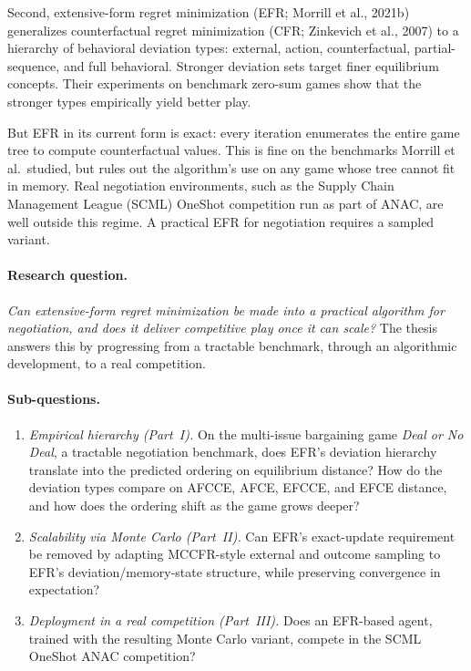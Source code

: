 \documentclass[11pt]{article}
\begin{document}
Second, extensive-form regret minimization (EFR; Morrill et al., 2021b) generalizes counterfactual regret minimization (CFR; Zinkevich et al., 2007) to a hierarchy of behavioral deviation types: external, action, counterfactual, partial-sequence, and full behavioral. Stronger deviation sets target finer equilibrium concepts. Their experiments on benchmark zero-sum games show that the stronger types empirically yield better play.

But EFR in its current form is exact: every iteration enumerates the entire game tree to compute counterfactual values. This is fine on the benchmarks Morrill et al.\ studied, but rules out the algorithm's use on any game whose tree cannot fit in memory. Real negotiation environments, such as the Supply Chain Management League (SCML) OneShot competition run as part of ANAC, are well outside this regime. A practical EFR for negotiation requires a sampled variant.

\paragraph{Research question.} \emph{Can extensive-form regret minimization be made into a practical algorithm for negotiation, and does it deliver competitive play once it can scale?} The thesis answers this by progressing from a tractable benchmark, through an algorithmic development, to a real competition.

\paragraph{Sub-questions.}
\begin{enumerate}
    \item \emph{Empirical hierarchy (Part~I).} On the multi-issue bargaining game \emph{Deal or No Deal}, a tractable negotiation benchmark, does EFR's deviation hierarchy translate into the predicted ordering on equilibrium distance? How do the deviation types compare on AFCCE, AFCE, EFCCE, and EFCE distance, and how does the ordering shift as the game grows deeper?

    \item \emph{Scalability via Monte Carlo (Part~II).} Can EFR's exact-update requirement be removed by adapting MCCFR-style external and outcome sampling to EFR's deviation/memory-state structure, while preserving convergence in expectation?

    \item \emph{Deployment in a real competition (Part~III).} Does an EFR-based agent, trained with the resulting Monte Carlo variant, compete in the SCML OneShot ANAC competition?
\end{enumerate}
\end{document}
